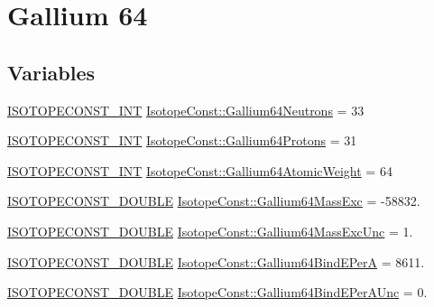 \hypertarget{group___isotope_const-_gallium-_ga64}{}\section{Gallium 64}
\label{group___isotope_const-_gallium-_ga64}
\subsection*{Variables}
\begin{DoxyCompactItemize}
\item 
\mbox{\hyperlink{group___isotope_const-_macros_ga5f18360b3e99483a35c32d789e62621c}{I\+S\+O\+T\+O\+P\+E\+C\+O\+N\+S\+T\+\_\+\+I\+NT}} \mbox{\hyperlink{group___isotope_const-_gallium-_ga64_ga247fe3de5f1a603d5afcaad3e83b20da}{Isotope\+Const\+::\+Gallium64\+Neutrons}} = 33
\item 
\mbox{\hyperlink{group___isotope_const-_macros_ga5f18360b3e99483a35c32d789e62621c}{I\+S\+O\+T\+O\+P\+E\+C\+O\+N\+S\+T\+\_\+\+I\+NT}} \mbox{\hyperlink{group___isotope_const-_gallium-_ga64_gae4f7a89675315bd1e0f6c88c157d4bd7}{Isotope\+Const\+::\+Gallium64\+Protons}} = 31
\item 
\mbox{\hyperlink{group___isotope_const-_macros_ga5f18360b3e99483a35c32d789e62621c}{I\+S\+O\+T\+O\+P\+E\+C\+O\+N\+S\+T\+\_\+\+I\+NT}} \mbox{\hyperlink{group___isotope_const-_gallium-_ga64_gadf56e81c92f0e5085334a48874d7214f}{Isotope\+Const\+::\+Gallium64\+Atomic\+Weight}} = 64
\item 
\mbox{\hyperlink{group___isotope_const-_macros_ga8f45a7272ce02c0b4c65c44636ed719a}{I\+S\+O\+T\+O\+P\+E\+C\+O\+N\+S\+T\+\_\+\+D\+O\+U\+B\+LE}} \mbox{\hyperlink{group___isotope_const-_gallium-_ga64_gaef37d1a61e249ee3270a46941b1bcc39}{Isotope\+Const\+::\+Gallium64\+Mass\+Exc}} = -\/58832.
\item 
\mbox{\hyperlink{group___isotope_const-_macros_ga8f45a7272ce02c0b4c65c44636ed719a}{I\+S\+O\+T\+O\+P\+E\+C\+O\+N\+S\+T\+\_\+\+D\+O\+U\+B\+LE}} \mbox{\hyperlink{group___isotope_const-_gallium-_ga64_gabae35b9c3e0bea4ff2e785ead2458614}{Isotope\+Const\+::\+Gallium64\+Mass\+Exc\+Unc}} = 1.
\item 
\mbox{\hyperlink{group___isotope_const-_macros_ga8f45a7272ce02c0b4c65c44636ed719a}{I\+S\+O\+T\+O\+P\+E\+C\+O\+N\+S\+T\+\_\+\+D\+O\+U\+B\+LE}} \mbox{\hyperlink{group___isotope_const-_gallium-_ga64_ga9619e3a0155dfe0c25e5d1a616658e50}{Isotope\+Const\+::\+Gallium64\+Bind\+E\+PerA}} = 8611.
\item 
\mbox{\hyperlink{group___isotope_const-_macros_ga8f45a7272ce02c0b4c65c44636ed719a}{I\+S\+O\+T\+O\+P\+E\+C\+O\+N\+S\+T\+\_\+\+D\+O\+U\+B\+LE}} \mbox{\hyperlink{group___isotope_const-_gallium-_ga64_ga7e28c17568c8532736f4d637f830c356}{Isotope\+Const\+::\+Gallium64\+Bind\+E\+Per\+A\+Unc}} = 0.

\end{DoxyCompactItemize}
